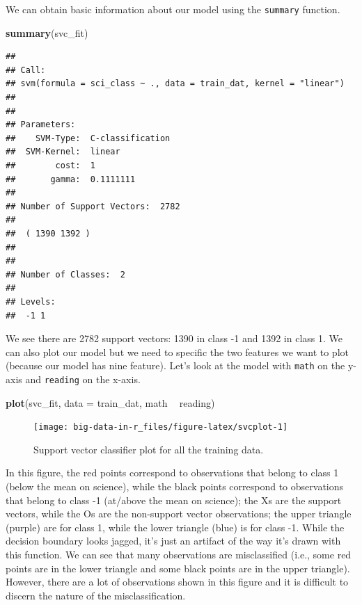 \documentclass[]{book}
\newenvironment{Shaded}{\begin{snugshade}}{\end{snugshade}}
\newcommand{\DataTypeTok}[1]{\textcolor[rgb]{0.13,0.29,0.53}{#1}}
\newcommand{\KeywordTok}[1]{\textcolor[rgb]{0.13,0.29,0.53}{\textbf{#1}}}
\newcommand{\NormalTok}[1]{#1}
\newcommand{\OperatorTok}[1]{\textcolor[rgb]{0.81,0.36,0.00}{\textbf{#1}}}
\newcommand{\StringTok}[1]{\textcolor[rgb]{0.31,0.60,0.02}{#1}}
\begin{document}
We can obtain basic information about our model using the \texttt{summary} function.

\begin{Shaded}
\begin{Highlighting}[]
\KeywordTok{summary}\NormalTok{(svc_fit)}
\end{Highlighting}
\end{Shaded}

\begin{verbatim}
## 
## Call:
## svm(formula = sci_class ~ ., data = train_dat, kernel = "linear")
## 
## 
## Parameters:
##    SVM-Type:  C-classification 
##  SVM-Kernel:  linear 
##        cost:  1 
##       gamma:  0.1111111 
## 
## Number of Support Vectors:  2782
## 
##  ( 1390 1392 )
## 
## 
## Number of Classes:  2 
## 
## Levels: 
##  -1 1
\end{verbatim}

We see there are 2782 support vectors: 1390 in class -1 and 1392 in class 1. We can also plot our model but we need to specific the two features we want to plot (because our model has nine feature). Let's look at the model with \texttt{math} on the y-axis and \texttt{reading} on the x-axis.

\begin{Shaded}
\begin{Highlighting}[]
\KeywordTok{plot}\NormalTok{(svc_fit, }\DataTypeTok{data =}\NormalTok{ train_dat, math }\OperatorTok{~}\StringTok{ }\NormalTok{reading)}
\end{Highlighting}
\end{Shaded}

\begin{figure}
\texttt{[image: big-data-in-r\_files/figure-latex/svcplot-1]} \caption{Support vector classifier plot for all the training data.}\label{fig:svcplot}
\end{figure}

In this figure, the red points correspond to observations that belong to class 1 (below the mean on science), while the black points correspond to observations that belong to class -1 (at/above the mean on science); the Xs are the support vectors, while the Os are the non-support vector observations; the upper triangle (purple) are for class 1, while the lower triangle (blue) is for class -1. While the decision boundary looks jagged, it's just an artifact of the way it's drawn with this function. We can see that many observations are misclassified (i.e., some red points are in the lower triangle and some black points are in the upper triangle). However, there are a lot of observations shown in this figure and it is difficult to discern the nature of the misclassification.
\end{document}

